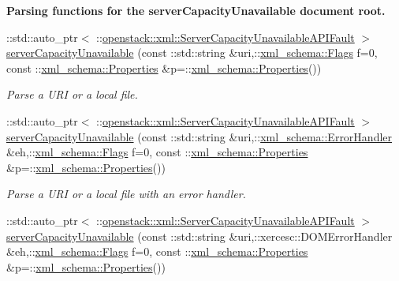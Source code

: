 \begin{Indent}{\bf Parsing functions for the serverCapacityUnavailable document root.}\par
\begin{DoxyCompactItemize}
\item 
::std::auto\_\-ptr$<$ ::\hyperlink{classopenstack_1_1xml_1_1ServerCapacityUnavailableAPIFault}{openstack::xml::ServerCapacityUnavailableAPIFault} $>$ \hyperlink{namespaceopenstack_1_1xml_a2317506133641b7bb6e1ef675560450e}{serverCapacityUnavailable} (const ::std::string \&uri,::\hyperlink{namespacexml__schema_affb4c227cbd9aa7453dd1dc5a1401943}{xml\_\-schema::Flags} f=0, const ::\hyperlink{namespacexml__schema_ad27ce19a7ee1d3b1064092648898f64c}{xml\_\-schema::Properties} \&p=::\hyperlink{namespacexml__schema_ad27ce19a7ee1d3b1064092648898f64c}{xml\_\-schema::Properties}())
\begin{DoxyCompactList}\small\item\em Parse a URI or a local file. \item\end{DoxyCompactList}\item 
::std::auto\_\-ptr$<$ ::\hyperlink{classopenstack_1_1xml_1_1ServerCapacityUnavailableAPIFault}{openstack::xml::ServerCapacityUnavailableAPIFault} $>$ \hyperlink{namespaceopenstack_1_1xml_ab43faf0a555dd89fd47ef6fd97418d42}{serverCapacityUnavailable} (const ::std::string \&uri,::\hyperlink{namespacexml__schema_ab1c9361bfd3b404eaabf0c31eded79dc}{xml\_\-schema::ErrorHandler} \&eh,::\hyperlink{namespacexml__schema_affb4c227cbd9aa7453dd1dc5a1401943}{xml\_\-schema::Flags} f=0, const ::\hyperlink{namespacexml__schema_ad27ce19a7ee1d3b1064092648898f64c}{xml\_\-schema::Properties} \&p=::\hyperlink{namespacexml__schema_ad27ce19a7ee1d3b1064092648898f64c}{xml\_\-schema::Properties}())
\begin{DoxyCompactList}\small\item\em Parse a URI or a local file with an error handler. \item\end{DoxyCompactList}\item 
::std::auto\_\-ptr$<$ ::\hyperlink{classopenstack_1_1xml_1_1ServerCapacityUnavailableAPIFault}{openstack::xml::ServerCapacityUnavailableAPIFault} $>$ \hyperlink{namespaceopenstack_1_1xml_a06c5f4228c34aae039f21d497488b1ec}{serverCapacityUnavailable} (const ::std::string \&uri,::xercesc::DOMErrorHandler \&eh,::\hyperlink{namespacexml__schema_affb4c227cbd9aa7453dd1dc5a1401943}{xml\_\-schema::Flags} f=0, const ::\hyperlink{namespacexml__schema_ad27ce19a7ee1d3b1064092648898f64c}{xml\_\-schema::Properties} \&p=::\hyperlink{namespacexml__schema_ad27ce19a7ee1d3b1064092648898f64c}{xml\_\-schema::Properties}())

\end{DoxyCompactItemize}
\end{Indent}
